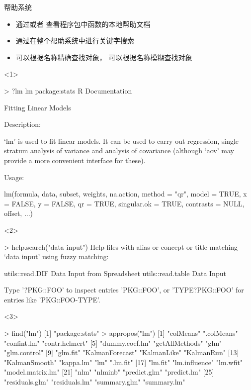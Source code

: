 \documentclass{beamerthemeMono}
\begin{document}
\begin{frame}[t,fragile]{\subsecname}{帮助系统}
  \begin{itemize}
     \item 通过或者
               查看程序包中函数的本地帮助文档
     \item 通过在整个帮助系统中进行关键字搜索
     \item {}可以根据名称精确查找对象，
               可以根据名称模糊查找对象
  \end{itemize}

\begin{overlayarea}{\textwidth}{\textheight}
\begin{onlyenv}<1>
\begin{rcode}
> ?lm
lm               package:stats            R Documentation

Fitting Linear Models

Description:

     ‘lm’ is used to fit linear models.  It can be used to carry out regression, single stratum analysis of variance and analysis of covariance (although ‘aov’ may provide a more convenient interface for these).

Usage:

     lm(formula, data, subset, weights, na.action, method = "qr", model = TRUE, x = FALSE, y = FALSE, qr = TRUE, singular.ok = TRUE, contrasts = NULL, offset, ...)
\end{rcode}
\end{onlyenv}

\begin{onlyenv}<2>
\begin{rcode}
> help.search("data input")
Help files with alias or concept or title matching ‘data input’ using fuzzy matching:


utils::read.DIF         Data Input from Spreadsheet
utils::read.table       Data Input


Type '?PKG::FOO' to inspect entries 'PKG::FOO', or 'TYPE?PKG::FOO' for entries like 'PKG::FOO-TYPE'.
\end{rcode}
\end{onlyenv}

\begin{onlyenv}<3>
\begin{rcode}
> find("lm")
[1] "package:stats"
> appropos("lm")
 [1] "colMeans"        ".colMeans"       "confint.lm"      "contr.helmert"  
 [5] "dummy.coef.lm"   "getAllMethods"   "glm"             "glm.control"    
 [9] "glm.fit"         "KalmanForecast"  "KalmanLike"      "KalmanRun"      
[13] "KalmanSmooth"    "kappa.lm"        "lm"              ".lm.fit"        
[17] "lm.fit"          "lm.influence"    "lm.wfit"         "model.matrix.lm"
[21] "nlm"             "nlminb"          "predict.glm"     "predict.lm"     
[25] "residuals.glm"   "residuals.lm"    "summary.glm"     "summary.lm" 
\end{rcode}
\end{onlyenv}

\end{overlayarea}
\end{frame}
\end{document}
